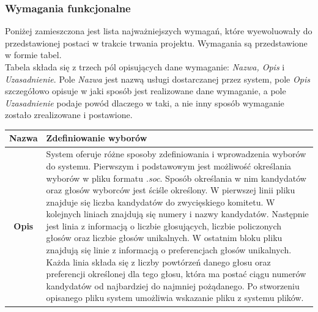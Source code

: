 \documentclass[polish,11pt]{aghthesis}
\begin{document}
\subsubsection{Wymagania funkcjonalne}
Poniżej zamieszczona jest lista najważniejszych wymagań, które wyewoluowały do przedstawionej postaci w trakcie trwania projektu. Wymagania są przedstawione w formie tabel.\\
Tabela składa się z trzech pól opisujących dane wymaganie: \textit{Nazwa, Opis} i \textit{Uzasadnienie}. Pole \textit{Nazwa} jest nazwą usługi dostarczanej przez system, pole \textit{Opis} szczegółowo opisuje w jaki sposób jest realizowane dane wymaganie, a pole \textit{Uzasadnienie} podaje powód dlaczego w taki, a nie inny sposób wymaganie zostało zrealizowane i postawione.
\newpage
\begin{table}
\centering
\begin{tabular}{|c|p{13cm}|}
\hline
\textbf{Nazwa} & Zdefiniowanie wyborów \\ 
\hline 
\textbf{Opis} & System oferuje różne sposoby zdefiniowania i wprowadzenia wyborów
do systemu. Pierwszym i podstawowym jest możliwość określania
wyborów w pliku formatu \textit{.soc}. Sposób określania w nim kandydatów
oraz głosów wyborców jest ściśle określony. W pierwszej linii pliku
znajduje się liczba kandydatów do zwycięskiego komitetu. W kolejnych
liniach znajdują się numery i nazwy kandydatów. Następnie jest linia z
informacją o liczbie głosujących, liczbie policzonych głosów oraz liczbie
głosów unikalnych. W ostatnim bloku pliku znajdują się linie z
informacją o preferencjach głosów unikalnych. Każda linia składa się z
liczby powtórzeń danego głosu oraz preferencji określonej dla tego
głosu, która ma postać ciągu numerów kandydatów od najbardziej do
najmniej pożądanego. Po stworzeniu opisanego pliku system umożliwia
wskazanie pliku z systemu plików.


\end{tabular}
\end{table}
\end{document}
